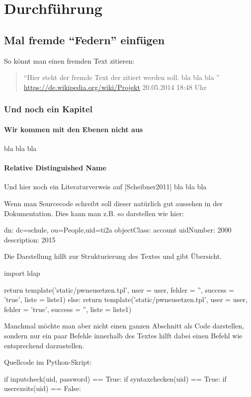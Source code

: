 \newpage
\section{Durchführung}
\subsection{Mal fremde ``Federn'' einfügen}
So könnt man einen fremden Text zitieren:
\begin{quote}
``Hier steht der fremde Text der zitiert werden soll. bla bla bla ''
\newline
\url{https://de.wikipedia.org/wiki/Projekt} 20.05.2014 18:48 Uhr
\end{quote}
\subsubsection{Und noch ein Kapitel}
\paragraph{Wir kommen mit den Ebenen nicht aus}$\;$\\
bla bla bla 
\paragraph{Relative Distinguished Name}$\;$\\
Und hier noch ein Literaturverweis auf [Scheibner2011]
bla bla bla 

Wenn man Sourcecode schreibt soll dieser natürlich gut aussehen in der Dokumentation. Dies kann man z.B. so 
darstellen wie hier:
\begin{python}
dn: dc=schule, ou=People,uid=ti2a
objectClass: account
uidNumber: 2000
description: 2015
\end{python}

Die Darstellung hilft zur Strukturierung des Textes und gibt Übersicht.
\begin{python}
import ldap
\end{python}

\begin{python}
return template('static/pwneusetzen.tpl', user = user, 
			fehler = '', success = 'true',
			liste = liste1)
else:
	return template('static/pwneusetzen.tpl', 
	user = user, fehler = 'true', 
	success = '', liste = liste1)
\end{python}

Manchmal möchte man aber nicht einen ganzen Abschnitt als Code darstellen, sondern nur ein paar Befehle 
innerhalb des Textes  hilft dabei einen Befehl wie  
entsprechend darzustellen.

Quellcode im Python-Skript:
\begin{python}
if inputcheck(uid, password) == True:
	if syntaxchecken(uid) == True:
		if userexsits(uid) == False:
\end{python}


